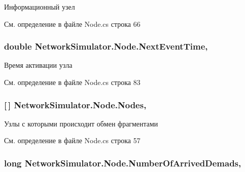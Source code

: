 Информационный узел 



См. определение в файле Node.\+cs строка 66

\subsubsection[{\texorpdfstring{Next\+Event\+Time}{NextEventTime}}]{\setlength{\rightskip}{0pt plus 5cm}double Network\+Simulator.\+Node.\+Next\+Event\+Time\hspace{0.3cm}{\ttfamily [get]}, {}}\hypertarget{class_network_simulator_1_1_node_ab3ae85d27d7e9056751bd826f1a3432b}{}\label{class_network_simulator_1_1_node_ab3ae85d27d7e9056751bd826f1a3432b}


Время активации узла 



См. определение в файле Node.\+cs строка 83

\subsubsection[{\texorpdfstring{Nodes}{Nodes}}]{ \mbox{[}$\,$\mbox{]} Network\+Simulator.\+Node.\+Nodes\hspace{0.3cm}{\ttfamily [get]}, {}}\hypertarget{class_network_simulator_1_1_node_abae5930cce02aa93551aefe417b23fa0}{}\label{class_network_simulator_1_1_node_abae5930cce02aa93551aefe417b23fa0}


Узлы с которыми происходит обмен фрагментами 



См. определение в файле Node.\+cs строка 57

\subsubsection[{\texorpdfstring{Number\+Of\+Arrived\+Demads}{NumberOfArrivedDemads}}]{\setlength{\rightskip}{0pt plus 5cm}long Network\+Simulator.\+Node.\+Number\+Of\+Arrived\+Demads\hspace{0.3cm}{\ttfamily [get]}, {}}\hypertarget{class_network_simulator_1_1_node_a24aabc6ded4e970b0c2c5c3bcbdf6cd8}{}\label{class_network_simulator_1_1_node_a24aabc6ded4e970b0c2c5c3bcbdf6cd8}


